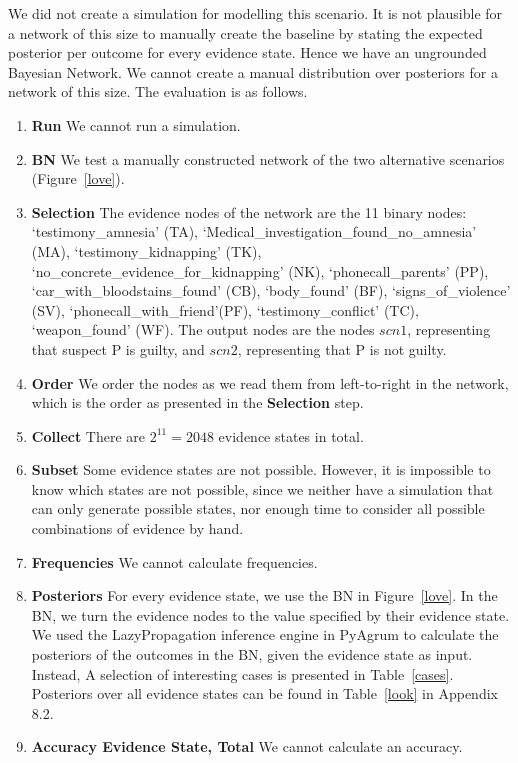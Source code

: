\documentclass[12pt]{article}
\begin{document}
We did not create a simulation for modelling this scenario. It is not plausible for a network of this size to manually create the baseline by stating the expected posterior per outcome for every evidence state. Hence we have an ungrounded Bayesian Network. We cannot create a manual distribution over posteriors for a network of this size. The evaluation is as follows.

\begin{enumerate}
\item \textbf{Run} We cannot run a simulation.
\item \textbf{BN} We test a manually constructed network of the two alternative scenarios (Figure~\ref{love}).
\item \textbf{Selection} The evidence nodes of the network are the 11 binary nodes: `testimony\_amnesia' (TA), `Medical\_investigation\_found\_no\_amnesia' (MA), `testimony\_kidnapping' (TK), `no\_concrete\_evidence\_for\_kidnapping' (NK),
 `phonecall\_parents' (PP),  `car\_with\_bloodstains\_found' (CB), `body\_found' (BF), `signs\_of\_violence' (SV), `phonecall\_with\_friend'(PF), `testimony\_conflict' (TC), `weapon\_found' (WF). The output nodes are the nodes $scn1$, representing that suspect P is guilty, and $scn2$, representing that P is not guilty.
\item \textbf{Order} We order the nodes as we read them from left-to-right in the network, which is the order as presented in the \textbf{Selection} step.
\item \textbf{Collect} There are $2^{11} = 2048$ evidence states in total.
\item \textbf{Subset} Some evidence states are not possible. However, it is impossible to know which states are not possible, since we neither have a simulation that can only generate possible states, nor enough time to consider all possible combinations of evidence by hand.
\item \textbf{Frequencies} We cannot calculate frequencies.
\item \textbf{Posteriors} For every evidence state, we use the BN in Figure~\ref{love}. In the BN, we turn the evidence nodes to the value specified by their evidence state. We used the LazyPropagation inference engine in PyAgrum to calculate the posteriors of the outcomes in the BN, given the evidence state as input. Instead, A selection of interesting cases is presented in Table~\ref{cases}. Posteriors over all evidence states can be found in Table~\ref{look} in Appendix 8.2.
\item \textbf{Accuracy Evidence State, Total} We cannot calculate an accuracy.
\end{enumerate}
\end{document}
